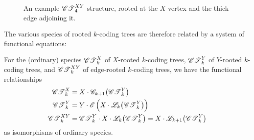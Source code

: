 \documentclass[distribution,draft]{brandiss} %
\numberwithin{section}{chapter}
\numberwithin{figure}{chapter}
\begin{document}
\begin{figure}[htb]
  \centering
  \def\kval{4}
  \caption[An example $XY$-rooted $k$-coding tree]{An example $\ctxy{\kval}$-structure, rooted at the $X$-vertex and the thick edge adjoining it.}
  \label{fig:ctxyconst}
\end{figure}

The various species of rooted $k$-coding trees are therefore related by a system of functional equations:
\begin{observation}
  \label{obs:funcdecompct}
  For the (ordinary) species $\mathscr{CT}_{k}^{X}$ of $X$-rooted $k$-coding trees, $\mathscr{CT}_{k}^{Y}$ of $Y$-rooted $k$-coding trees, and $\mathscr{CT}_{k}^{XY}$ of edge-rooted $k$-coding trees, we have the functional relationships
  \begin{subequations}
    \label{eq:ctfunc}
    \begin{align}
      \ctx{k} &= X \cdot \specname{C}_{k+1} \pbracs[big]{\cty{k}} \label{eq:ctxfunc} \\
      \cty{k} &= Y \cdot \specname{E} \pbrac{X \cdot \specname{L}_{k} \pbracs[big]{\cty{k}}} \label{eq:ctyfunc} \\
      \ctxy{k} &= \cty{k} \cdot X \cdot \specname{L}_{k} \pbracs[big]{\cty{k}} = X \cdot \specname{L}_{k+1} \pbracs[big]{\cty{k}} \label{eq:ctxyfunc}
    \end{align}
  \end{subequations}
  as isomorphisms of ordinary species.
\end{observation}
\end{document}
